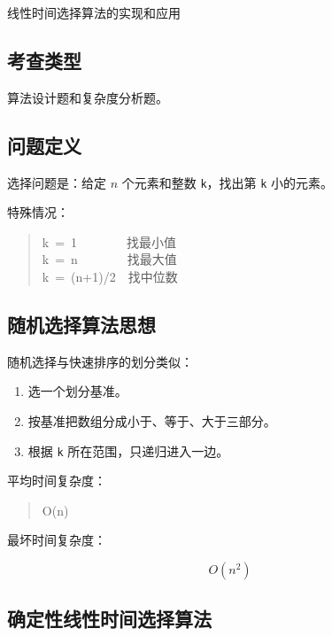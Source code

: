 \documentclass[UTF8,zihao=-4]{ctexart}
\begin{document}
线性时间选择算法的实现和应用

\subsection*{考查类型}

算法设计题和复杂度分析题。

\subsection*{问题定义}

选择问题是：给定 $n$ 个元素和整数 \texttt{k}，找出第 \texttt{k} 小的元素。

特殊情况：

\begin{quote}
\small\ttfamily\raggedright
\relax k\ =\ 1\ \ \ \ \ \ \ \ 找最小值\\
\relax k\ =\ n\ \ \ \ \ \ \ \ 找最大值\\
\relax k\ =\ (n+1)/2\ \ 找中位数\\
\end{quote}

\subsection*{随机选择算法思想}

随机选择与快速排序的划分类似：

\begin{enumerate}
\item 选一个划分基准。
\item 按基准把数组分成小于、等于、大于三部分。
\item 根据 \texttt{k} 所在范围，只递归进入一边。
\end{enumerate}

平均时间复杂度：

\begin{quote}
\small\ttfamily\raggedright
\relax O(n)\\
\end{quote}

最坏时间复杂度：

\[O(n^{2})\]

\subsection*{确定性线性时间选择算法}
\end{document}
